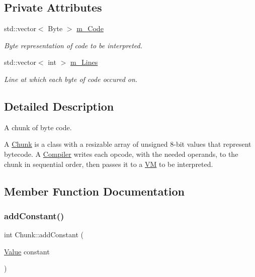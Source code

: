 \subsection*{Private Attributes}
\begin{DoxyCompactItemize}
\item 
\mbox{\label{class_chunk_a71817b16f0230f80d1dd9a0fc2338b59}} 
std\+::vector$<$ Byte $>$ \hyperlink{class_chunk_a71817b16f0230f80d1dd9a0fc2338b59}{m\+\_\+\+Code}
\begin{DoxyCompactList}\small\item\em Byte representation of code to be interpreted. \end{DoxyCompactList}\item 
\mbox{\label{class_chunk_a2227be48de0ad220a5547b592114ad04}} 
std\+::vector$<$ int $>$ \hyperlink{class_chunk_a2227be48de0ad220a5547b592114ad04}{m\+\_\+\+Lines}
\begin{DoxyCompactList}\small\item\em Line at which each byte of code occured on. \end{DoxyCompactList}\end{DoxyCompactItemize}


\subsection{Detailed Description}
A chunk of byte code. 

A \hyperlink{class_chunk}{Chunk} is a class with a resizable array of unsigned 8-\/bit values that represent bytecode. A \hyperlink{class_compiler}{Compiler} writes each opcode, with the needed operands, to the chunk in sequential order, then passes it to a \hyperlink{class_v_m}{VM} to be interpreted. 

\subsection{Member Function Documentation}
\mbox{\label{class_chunk_a138fc2e29b0a19f87d6c3fd7560815f8}} 
\subsubsection{\texorpdfstring{add\+Constant()}{addConstant()}}
{\footnotesize\ttfamily int Chunk\+::add\+Constant (\begin{DoxyParamCaption}\item[{\hyperlink{class_value}{Value}}]{constant }\end{DoxyParamCaption})}




